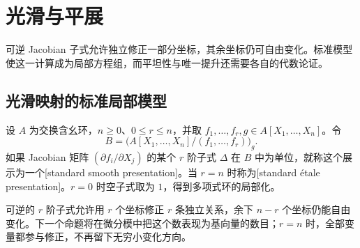 
\section{光滑与平展}
\label{b3:sec:2303}

可逆 Jacobian 子式允许独立修正一部分坐标，其余坐标仍可自由变化。标准模型使这一计算成为局部方程组，而平坦性与唯一提升还需要各自的代数论证。

%
%
%

\subsection{光滑映射的标准局部模型}
\label{b3:subsec:2303:01}

\begin{definition}\label{b3:def:standard-smooth-model}
	设 \(A\) 为交换含幺环，\(n\ge0\)、\(0\le r\le n\)，并取 \(f_1,\ldots,f_r,g\in A[X_1,\ldots,X_n]\)。令
	\[
		B=\bigl(A[X_1,\ldots,X_n]/(f_1,\ldots,f_r)\bigr)_g.
	\]
	如果 Jacobian 矩阵 \((\partial f_i/\partial X_j)\) 的某个 \(r\) 阶子式 \(\Delta\) 在 \(B\) 中为单位，就称这个展示为一个[standard smooth presentation]。当 \(r=n\) 时称为[standard étale presentation]。\(r=0\) 时空子式取为 \(1\)，得到多项式环的局部化。
\end{definition}

可逆的 \(r\) 阶子式允许用 \(r\) 个坐标修正 \(r\) 条独立关系，余下 \(n-r\) 个坐标仍能自由变化。下一个命题将在微分模中把这个数表现为基向量的数目；\(r=n\) 时，全部变量都参与修正，不再留下无穷小变化方向。

